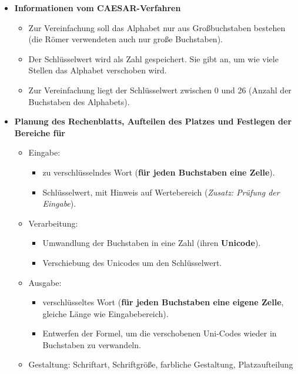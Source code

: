 \documentclass[10pt, a4paper]{scrartcl}
\begin{document}
\begin{itemize}
	\item \textbf{Informationen vom CAESAR-Verfahren}
	\begin{itemize}
		\item Zur Vereinfachung soll das Alphabet nur aus Großbuchstaben bestehen (die Römer verwendeten auch nur große Buchstaben).
		\item Der Schlüsselwert wird als Zahl gespeichert. Sie gibt an, um wie viele Stellen das Alphabet verschoben wird.
		\item Zur Vereinfachung liegt der Schlüsselwert zwischen 0 und 26 (Anzahl der Buchstaben des Alphabets).
	\end{itemize}
	\item \textbf{Planung des Rechenblatts, Aufteilen des Platzes und Festlegen der Bereiche für}
	\begin{itemize}
		\item Eingabe:
		\begin{itemize}
			\item zu verschlüsselndes Wort (\textbf{für jeden Buchstaben eine Zelle}).
			\item Schlüsselwert, mit Hinweis auf Wertebereich (\textit{Zusatz: Prüfung der Eingabe}).
		\end{itemize}
		\item Verarbeitung:
		\begin{itemize}
			\item Umwandlung der Buchstaben in eine Zahl (ihren \textbf{Unicode}).
			\item Verschiebung des Unicodes um den Schlüsselwert.
		\end{itemize}
		\item Ausgabe:
		\begin{itemize}
			\item verschlüsseltes Wort (\textbf{für jeden Buchstaben eine eigene Zelle}, gleiche Länge wie Eingabebereich).
			\item Entwerfen der Formel, um die verschobenen Uni-Codes wieder in Buchstaben zu verwandeln.
		\end{itemize}
		\item Gestaltung: Schriftart, Schriftgröße, farbliche Gestaltung, Platzaufteilung
	\end{itemize}
\end{itemize}

\clearpage
\end{document}
